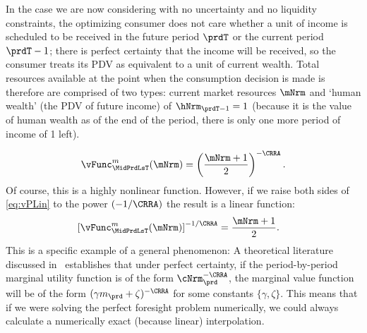 \documentclass[\econtexRoot/SolvingMicroDSOPs]{subfiles}
\begin{document}
In the case we are now considering with no uncertainty and no liquidity constraints, the optimizing consumer does not care whether a unit of income is scheduled to be received in the future period $\prdT$ or the current period $\prdT-1$; there is perfect certainty that the income will be received, so the consumer treats its PDV as equivalent to a unit of current wealth.  Total resources available at the point when the consumption decision is made is therefore are comprised of two types: current market resources $\mNrm$ and `human wealth' (the PDV of future income) of $\hNrm_{\prdT-1}=1$ (because it is the value of human wealth as of the end of the period, there is only one more period of income of 1 left).

\begin{equation}
  \vFunc^{m}_{\MidPrdLsT}(\mNrm)  = \left(\frac{\mNrm+1}{2}\right)^{-\CRRA} \label{eq:vPLin}.
\end{equation}
Of course, this is a highly nonlinear function.  However, if we raise both sides of \eqref{eq:vPLin} to the power $(-1/\CRRA)$ the result is a linear function:
\begin{equation}\begin{gathered}\begin{aligned}
      \left[\vFunc^{m}_{\MidPrdLsT}(\mNrm)\right]^{-1/\CRRA}  & = \frac{\mNrm+1}{2}  .
    \end{aligned}\end{gathered}\end{equation}
This is a specific example of a general phenomenon: A theoretical literature discussed in~\cite{ckConcavity} establishes that under perfect certainty, if the period-by-period marginal utility function is of the form $\cNrm_{\prd}^{-\CRRA}$, the marginal value function will be of the form $(\gamma m_{\prd}+\zeta)^{-\CRRA}$ for some constants $\{\gamma,\zeta\}$.  This means that if we were solving the perfect foresight problem numerically, we could always calculate a numerically exact (because linear) interpolation.
\end{document}
